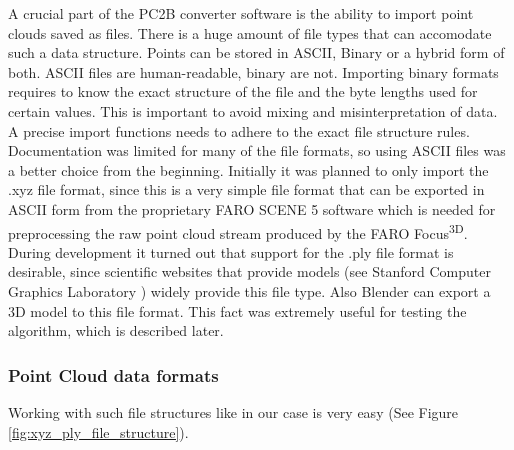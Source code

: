 A crucial part of the PC2B converter software is the ability to import point clouds saved as files. There is a huge amount of file types that can accomodate such a data structure. Points can be stored in ASCII, Binary or a hybrid form of both. ASCII files are human-readable, binary are not. Importing binary formats requires to know the exact structure of the file and the byte lengths used for certain values. This is important to avoid mixing and misinterpretation of data. A precise import functions needs to adhere to the exact file structure rules. Documentation was limited for many of the file formats, so using ASCII files was a better choice from the beginning. Initially it was planned to only import the .xyz file format, since this is a very simple file format that can be exported in ASCII form from the proprietary FARO SCENE 5 software which is needed for preprocessing the raw point cloud stream produced by the FARO Focus\textsuperscript{3D}.\\
During development it turned out that support for the .ply file format is desirable, since scientific websites that provide models (see Stanford Computer Graphics Laboratory \parencite{Stanford_repo}) widely provide this file type. Also Blender can export a 3D model to this file format. This fact was extremely useful for testing the algorithm, which is described later.

\subsubsection{Point Cloud data formats}

Working with such file structures like in our case is very easy (See Figure \ref{fig:xyz_ply_file_structure}).


